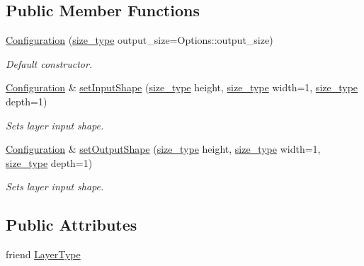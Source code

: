 \subsection*{Public Member Functions}
\begin{DoxyCompactItemize}
\item 
\hyperlink{classffnn_1_1layer_1_1activation_1_1_configuration_a66b6683274f77dcc3477799394fe62f0}{Configuration} (\hyperlink{namespaceffnn_a63b90a2fd70eb76684eac482a51633e5}{size\-\_\-type} output\-\_\-size=Options\-::output\-\_\-size)
\begin{DoxyCompactList}\small\item\em Default constructor. \end{DoxyCompactList}\item 
\hyperlink{classffnn_1_1layer_1_1activation_1_1_configuration}{Configuration} \& \hyperlink{classffnn_1_1layer_1_1activation_1_1_configuration_ae99f29753e6059b9527354f693e0e0bd}{set\-Input\-Shape} (\hyperlink{namespaceffnn_a63b90a2fd70eb76684eac482a51633e5}{size\-\_\-type} height, \hyperlink{namespaceffnn_a63b90a2fd70eb76684eac482a51633e5}{size\-\_\-type} width=1, \hyperlink{namespaceffnn_a63b90a2fd70eb76684eac482a51633e5}{size\-\_\-type} depth=1)
\begin{DoxyCompactList}\small\item\em Sets layer input shape. \end{DoxyCompactList}\item 
\hyperlink{classffnn_1_1layer_1_1activation_1_1_configuration}{Configuration} \& \hyperlink{classffnn_1_1layer_1_1activation_1_1_configuration_adefebc2ac3135a669a15a4d6874759f7}{set\-Output\-Shape} (\hyperlink{namespaceffnn_a63b90a2fd70eb76684eac482a51633e5}{size\-\_\-type} height, \hyperlink{namespaceffnn_a63b90a2fd70eb76684eac482a51633e5}{size\-\_\-type} width=1, \hyperlink{namespaceffnn_a63b90a2fd70eb76684eac482a51633e5}{size\-\_\-type} depth=1)
\begin{DoxyCompactList}\small\item\em Sets layer input shape. \end{DoxyCompactList}\end{DoxyCompactItemize}
\subsection*{Public Attributes}
\begin{DoxyCompactItemize}
\item 
friend \hyperlink{classffnn_1_1layer_1_1activation_1_1_configuration_a183c2a31aadeb5f7f04c7caa65e079f0}{Layer\-Type}
\end{DoxyCompactItemize}



